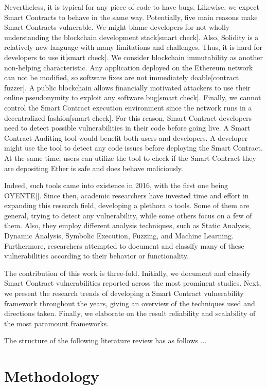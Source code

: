 \documentclass[a4paper,11pt]{article}
\begin{document}
Nevertheless, it is typical for any piece of code to have bugs. Likewise, we
expect Smart Contracts to behave in the same way. Potentially, five main reasons
make Smart Contracts vulnerable. We might blame developers for not wholly
understanding the blockchain development stack[smart check]. Also, Solidity is a
relatively new language with many limitations and challenges. Thus, it is hard
for developers to use it[smart check]. We consider blockchain immutability as
another non-helping characteristic. Any application deployed on the Ethereum
network can not be modified, so software fixes are not immediately
doable[contract fuzzer]. A public blockchain allows financially motivated
attackers to use their online pseudonymity to exploit any software bug[smart
check]. Finally, we cannot control the Smart Contract execution environment
since the network runs in a decentralized fashion[smart check]. For this reason,
Smart Contract developers need to detect possible vulnerabilities in their code
before going live. A Smart Contract Auditing tool would benefit both users and
developers. A developer might use the tool to detect any code issues before
deploying the Smart Contract. At the same time, users can utilize the tool to
check if the Smart Contract they are depositing Ether is safe and does behave
maliciously.

Indeed, such tools came into existence in 2016, with the first one being
OYENTE[]. Since then, academic researchers have invested time and effort in
expanding this research field, developing a plethora o tools. Some of them are
general, trying to detect any vulnerability, while some others focus on a few of
them. Also, they employ different analysis techniques, such as Static Analysis,
Dynamic Analysis, Symbolic Execution, Fuzzing, and Machine Learning.
Furthermore, researchers attempted to document and classify many of these
vulnerabilities according to their behavior or functionality.

The contribution of this work is three-fold. Initially, we document and classify
Smart Contract vulnerabilities reported across the most prominent studies. Next,
we present the research trends of developing a Smart Contract vulnerability
framework throughout the years, giving an overview of the techniques used and
directions taken. Finally, we elaborate on the result reliability and
scalability of the most paramount frameworks.

The structure of the following literature review has as follows ...

\section{Methodology}
\end{document}
